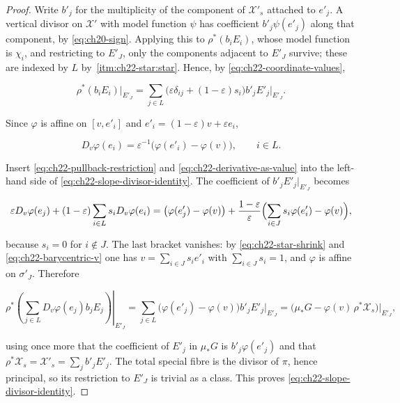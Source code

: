 \begin{proof}
Write \(b'_j\) for the multiplicity of the component of
\(\mathcal X'_s\) attached to \(e'_j\).  A vertical divisor on
\(\mathcal X'\) with model function \(\psi\) has coefficient
\(b'_j\psi(e'_j)\) along that component, by
\eqref{eq:ch20-sign}.  Applying this to
\(\rho^*(b_iE_i)\), whose model function is \(\chi_i\), and restricting to
\(E'_J\), only the components adjacent to \(E'_J\) survive; these are indexed
by \(L\) by \,\cref{itm:ch22-star:star}.  Hence,
by \eqref{eq:ch22-coordinate-values},

\[
 \rho^*(b_iE_i)|_{E'_J}
   =\sum_{j\in L}\bigl(\varepsilon\delta_{ij}
        +(1-\varepsilon)s_i\bigr)b'_jE'_j\big|_{E'_J}.
\tag{22.41}\label{eq:ch22-pullback-restriction}
\]

Since \(\varphi\) is affine on \([v,e'_i]\) and
\(e'_i=(1-\varepsilon)v+\varepsilon e_i\),

\[
 D_v\varphi(e_i)
   =\varepsilon^{-1}\bigl(\varphi(e'_i)-\varphi(v)\bigr),
       \qquad i\in L .
\tag{22.42}\label{eq:ch22-derivative-as-value}
\]

Insert \eqref{eq:ch22-pullback-restriction} and
\eqref{eq:ch22-derivative-as-value} into the left-hand side of
\eqref{eq:ch22-slope-divisor-identity}.  The coefficient of
\(b'_jE'_j|_{E'_J}\) becomes

\[
 \varepsilon D_v\varphi(e_j)
 +(1-\varepsilon)\sum_{i\in L}s_iD_v\varphi(e_i)
 =\bigl(\varphi(e'_j)-\varphi(v)\bigr)
 +\frac{1-\varepsilon}{\varepsilon}
   \Bigl(\sum_{i\in J}s_i\varphi(e'_i)-\varphi(v)\Bigr),
\]

because \(s_i=0\) for \(i\notin J\).  The last bracket vanishes: by
\eqref{eq:ch22-star-shrink} and \eqref{eq:ch22-barycentric-v} one has
\(v=\sum_{i\in J}s_ie'_i\) with \(\sum_{i\in J}s_i=1\), and \(\varphi\) is
affine on \(\sigma'_J\).  Therefore

\[
 \left.
 \rho^*\!\left(\sum_{j\in L}D_v\varphi(e_j)b_jE_j\right)\right|_{E'_J}
 =\sum_{j\in L}\bigl(\varphi(e'_j)-\varphi(v)\bigr)b'_jE'_j\big|_{E'_J}
 =\bigl(\mu_*G-\varphi(v)\,\rho^*\mathcal X_s\bigr)\big|_{E'_J},
\]

using once more that the coefficient of \(E'_j\) in \(\mu_*G\) is
\(b'_j\varphi(e'_j)\) and that
\(\rho^*\mathcal X_s=\mathcal X'_s=\sum_{j}b'_jE'_j\).  The total special
fibre is the divisor of \(\pi\), hence principal, so its restriction to
\(E'_J\) is trivial as a class.  This proves
\eqref{eq:ch22-slope-divisor-identity}.
\end{proof}

